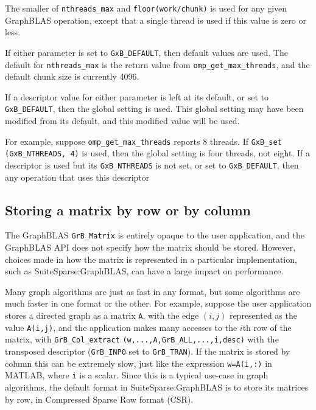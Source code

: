\documentclass[12pt]{article}
\begin{document}
The smaller of \verb'nthreads_max' and \verb'floor(work/chunk)' is used for any
given GraphBLAS operation, except that a single thread is used if this value is
zero or less.

If either parameter is set to \verb'GxB_DEFAULT', then default values are used.
The default for \verb'nthreads_max' is the return value from
\verb'omp_get_max_threads', and the default chunk size is currently 4096.

If a descriptor value for either parameter is left at its default, or set to
\verb'GxB_DEFAULT', then the global setting is used.  This global setting may
have been modified from its default, and this modified value will be used.

For example, suppose \verb'omp_get_max_threads' reports 8 threads.  If \newline
\verb'GxB_set (GxB_NTHREADS, 4)' is used, then the global setting is four
threads, not eight.  If a descriptor is used but its \verb'GxB_NTHREADS' is not
set, or set to \verb'GxB_DEFAULT', then any operation that uses this descriptor


\subsection{Storing a matrix by row or by column}

The GraphBLAS \verb'GrB_Matrix' is entirely opaque to the user application, and
the GraphBLAS API does not specify how the matrix should be stored.  However,
choices made in how the matrix is represented in a particular implementation,
such as SuiteSparse:GraphBLAS, can have a large impact on performance.

Many graph algorithms are just as fast in any format, but some algorithms are
much faster in one format or the other.  For example, suppose the user
application stores a directed graph as a matrix \verb'A', with the edge $(i,j)$
represented as the value \verb'A(i,j)', and the application makes many accesses
to the $i$th row of the matrix, with \verb'GrB_Col_extract'
\verb'(w,...,A,GrB_ALL,...,i,desc)' with the transposed descriptor
(\verb'GrB_INP0' set to \verb'GrB_TRAN').  If the matrix is stored by column
this can be extremely slow, just like the expression \verb'w=A(i,:)' in MATLAB,
where \verb'i' is a scalar.  Since this is a typical use-case in graph
algorithms, the default format in SuiteSparse:GraphBLAS is to store its
matrices by row, in Compressed Sparse Row format (CSR).
\end{document}
